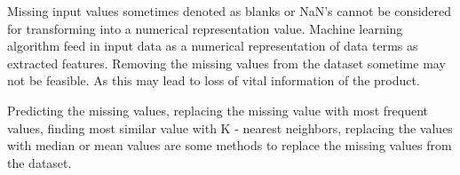 Missing input values sometimes denoted as blanks or NaN's cannot be considered for transforming into a numerical representation value. Machine learning algorithm feed in input data as a numerical representation of data terms as extracted features. Removing the missing values from the dataset sometime may not be feasible. As this may lead to loss of vital information of the product. 

Predicting the missing values, replacing the missing value with most frequent values, finding most similar value with K - nearest neighbors, replacing the values with median or mean values are some methods to replace the missing values from the dataset. 